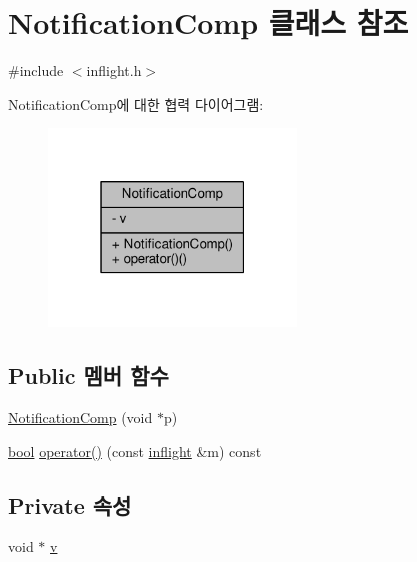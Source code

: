 \hypertarget{classavdecc__lib_1_1_notification_comp}{}\section{Notification\+Comp 클래스 참조}
\label{classavdecc__lib_1_1_notification_comp}


{\ttfamily \#include $<$inflight.\+h$>$}



Notification\+Comp에 대한 협력 다이어그램\+:
\nopagebreak
\begin{figure}[H]
\begin{center}
\leavevmode
\includegraphics[width=187pt]{classavdecc__lib_1_1_notification_comp__coll__graph}
\end{center}
\end{figure}
\subsection*{Public 멤버 함수}
\begin{DoxyCompactItemize}
\item 
\hyperlink{classavdecc__lib_1_1_notification_comp_a5652086e8797f8cbc0682a7178f545f8}{Notification\+Comp} (void $\ast$p)
\item 
\hyperlink{avb__gptp_8h_af6a258d8f3ee5206d682d799316314b1}{bool} \hyperlink{classavdecc__lib_1_1_notification_comp_ab7556cef0917137b0c40fd91888a7291}{operator()} (const \hyperlink{classavdecc__lib_1_1inflight}{inflight} \&m) const 
\end{DoxyCompactItemize}
\subsection*{Private 속성}
\begin{DoxyCompactItemize}
\item 
void $\ast$ \hyperlink{classavdecc__lib_1_1_notification_comp_a67806b49e20fb1170422969965db6ecb}{v}
\end{DoxyCompactItemize}


